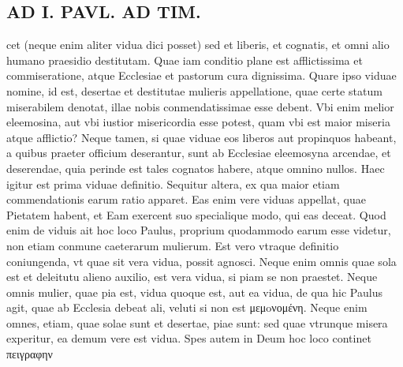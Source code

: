 \documentclass{article}
\begin{document}
\begin{pages}
\section*{AD I. PAVL. AD TIM. }
\marginpar{[ p.258 ]}\pstart cet (neque enim aliter vidua dici posset) sed et liberis, et cognatis, et omni alio humano praesidio destitutam. Quae iam conditio plane est afflictissima et commiseratione, atque Ecclesiae et pastorum cura dignissima. Quare ipso viduae nomine, id est, desertae et destitutae mulieris appellatione, quae certe statum miserabilem denotat, illae nobis conmendatissimae esse debent. Vbi enim melior eleemosina, aut vbi iustior misericordia esse potest, quam vbi est maior miseria atque afflictio? Neque  tamen, si quae viduae eos liberos aut propinquos habeant, a quibus praeter officium deserantur, sunt ab Ecclesiae eleemosyna arcendae, et deserendae, quia perinde est tales cognatos habere, atque omnino nullos. Haec igitur est prima viduae definitio.  \pend\pstart Sequitur altera, ex qua maior etiam commendationis earum ratio apparet. Eas enim vere viduas appellat, quae Pietatem habent, et Eam exercent suo specialique  modo, qui eas deceat. Quod enim de viduis ait hoc loco Paulus, proprium quodammodo earum esse videtur, non etiam conmune caeterarum mulierum. Est vero vtraque definitio coniungenda, vt quae sit vera vidua, possit agnosci. Neque  enim omnis quae sola est et deleitutu alieno auxilio, est vera vidua, si piam se non praestet. Neque omnis mulier, quae pia est, vidua quoque est, aut ea vidua, de qua hic Paulus agit, quae ab Ecclesia debeat ali, veluti si non est μεμoνομένη. Neque enim omnes, etiam, quae solae sunt et desertae, piae sunt: sed quae vtrunque misera experitur, ea demum vere est vidua.  \pend\pstart Spes autem in Deum hoc loco continet πειγραφην  \pend

\end{pages}
\end{document}
